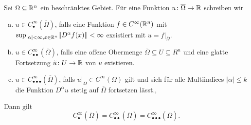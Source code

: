 \begin{lem}
  \label{lem:CInftyClosedOmega}
  Sei $\Omega \subseteq \mathbb{R}^n$ ein beschränktes Gebiet.
  Für eine Funktion $u \colon \overline\Omega \to \mathbb{R}$ schreiben wir
  \begin{enumerate}[(a)]
    \item $u \in C^\infty_\bullet(\overline\Omega)$,
      falls eine Funktion $f \in C^\infty(\mathbb{R}^n)$ mit $\sup_{|\alpha| < \infty, x \in \mathbb{R}^n} \lVert D^\alpha f(x) \rVert <  \infty$ exsistiert mit $u = f|_{\overline\Omega}$.\cite[S.23, I.3.1]{sohr2001navier}

    \item $u \in C^\infty_{\bullet\bullet}(\overline\Omega)$,
      falls eine offene Obermenge $\overline\Omega \subseteq U \subseteq R^n$ und eine glatte Fortsetzung $\tilde u \colon U \to \mathbb{R}$ von $u$ existieren.

    \item $ u \in C^\infty_{\bullet\bullet\bullet}(\overline\Omega)$,
    falls $u|_\Omega \in C^\infty(\Omega)$ gilt und sich für alle Multiindices $|\alpha|\leq k$ die Funktion $D^\alpha u$ stetig auf $\overline\Omega$ fortsetzen lässt.\cite[S.10, 1.28]{adams2003sobolev},\cite[S.35, II.1.3]{galdi2011navier}
   
  \end{enumerate}

  Dann gilt
  $$
    C^\infty_{\bullet}(\overline\Omega) =
    C^\infty_{\bullet\bullet}(\overline\Omega) =
    C^\infty_{\bullet\bullet\bullet}(\overline\Omega).
  $$
\end{lem}

